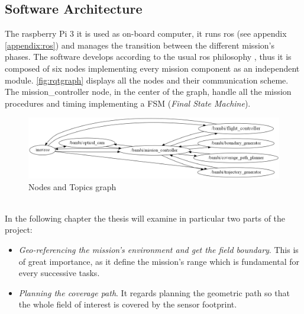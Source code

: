  \subsection{Software Architecture} %
 \label{sub:software_design}
 The raspberry Pi 3 it is used as on-board computer, it runs \acrshort{ros} (see appendix \ref{appendix:ros}) and manages the transition between the different mission's phases. The software develops according to the usual \acrshort{ros} philosophy \cite{288}, thus it is composed of six nodes implementing every mission component as an independent module. \autoref{fig:rqtgraph} displays all the nodes and their communication scheme. The \textsf{mission\_controller} node, in the center of the graph, handle all the mission procedures and timing implementing a FSM (\textit{Final State Machine}).
\begin{figure}[ht]
    \centering
    \includegraphics[width=1\textwidth, angle=0]{figures/C1/rqtgraph-all-noTopic.png}
    \caption{Nodes and Topics graph}
    \label{fig:rqtgraph}
\end{figure}\\
 In the following chapter the thesis will examine in particular two parts of the project:
 \begin{itemize}
  	\item \textit{Geo-referencing the mission's environment and get the field boundary}. This is of great importance, as it define the mission's range which is fundamental for every successive tasks.
  	\item \textit{Planning the coverage path}. It regards planning the geometric path so that the whole field of interest is covered by the sensor footprint.
  \end{itemize}

